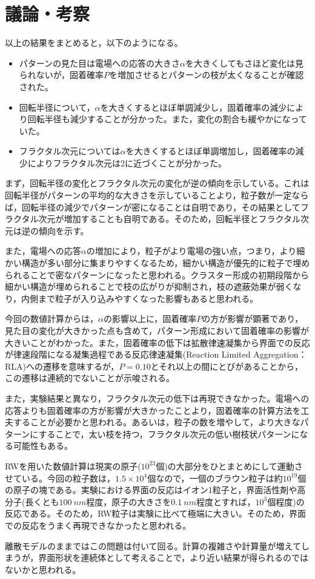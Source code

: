 \documentclass[autodetect-engine,dvi=dvipdfmx,a4paper,ja=standard,oneside,openany,11pt,draft]{bxjsbook}
\begin{document}
\section{議論・考察}
以上の結果をまとめると，以下のようになる。
\begin{itemize}
  \item パターンの見た目は電場への応答の大きさ$\alpha$を大きくしてもさほど変化は見られないが，固着確率$P$を増加させるとパターンの枝が太くなることが確認された。
  \item 回転半径について，$\alpha$を大きくするとほぼ単調減少し，固着確率の減少により回転半径も減少することが分かった。また，変化の割合も緩やかになっていた。
  \item フラクタル次元については$\alpha$を大きくするとほぼ単調増加し，固着確率の減少によりフラクタル次元は2に近づくことが分かった。
\end{itemize}

まず，回転半径の変化とフラクタル次元の変化が逆の傾向を示している。これは回転半径がパターンの平均的な大きさを示していることより，粒子数が一定ならば，回転半径の減少でパターンが密になることは自明であり，その結果としてフラクタル次元が増加することも自明である。そのため，回転半径とフラクタル次元は逆の傾向を示す。

また，電場への応答$\alpha$の増加により，粒子がより電場の強い点，つまり，より細かい構造が多い部分に集まりやすくなるため，細かい構造が優先的に粒子で埋められることで密なパターンになったと思われる。クラスター形成の初期段階から細かい構造が埋められることで枝の広がりが抑制され，枝の遮蔽効果が弱くなり，内側まで粒子が入り込みやすくなった影響もあると思われる。

今回の数値計算からは，$\alpha$の影響以上に，固着確率$P$の方が影響が顕著であり，見た目の変化が大きかった点も含めて，パターン形成において固着確率の影響が大きいことがわかった。また，固着確率の低下は拡散律速凝集から界面での反応が律速段階になる凝集過程である反応律速凝集(Reaction Limited Aggregation：RLA)への遷移を意味するが，$P=0.10$とそれ以上の間にとびがあることから，この遷移は連続的でないことが示唆される。

また，実験結果と異なり，フラクタル次元の低下は再現できなかった。電場への応答よりも固着確率の方が影響が大きかったことより，固着確率の計算方法を工夫することが必要かと思われる。あるいは，粒子の数を増やして，より大きなパターンにすることで，太い枝を持つ，フラクタル次元の低い樹枝状パターンになる可能性もある。

RWを用いた数値計算は現実の原子($10^{23}$個)の大部分をひとまとめにして運動させている。今回の粒子数は，$1.5\times10^4$個なので，一個のブラウン粒子は約$10^{19}$個の原子の塊である。実験における界面の反応はイオン1粒子と，界面活性剤や高分子(長くとも$\SI{100}{nm}$程度，原子の大きさを$\SI{0.1}{nm}$程度とすれば，$10^3$個程度)の反応である。そのため，RW粒子は実験に比べて極端に大きい。そのため，界面での反応をうまく再現できなかったと思われる。

離散モデルのままではこの問題は付いて回る。計算の複雑さや計算量が増えてしまうが，界面形状を連続体として考えることで，より近い結果が得られるのではないかと思われる。

\ifdraft{
  
  
}{}
\end{document}
